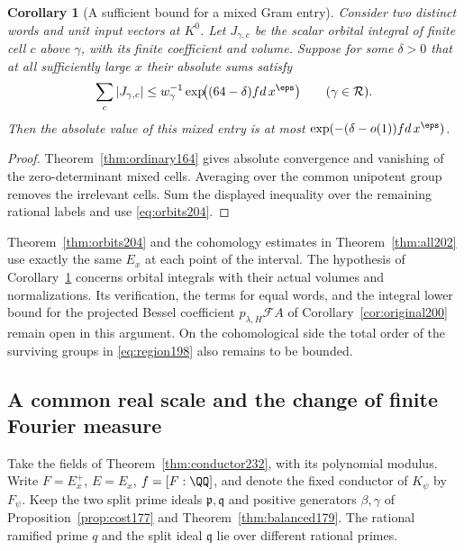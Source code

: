 \documentclass[a4paper,11pt]{article}
\newtheorem{corollary}[proposition]{Corollary}
\theoremstyle{definition}
\theoremstyle{remark}
\numberwithin{equation}{section}
\begin{document}
\begin{corollary}[A sufficient bound for a mixed Gram entry]
\label{cor:amplitude204}
Consider two distinct words and unit input vectors at \(K^0\).
Let \(J_{\gamma,c}\) be the scalar orbital integral of finite
cell \(c\) above \(\gamma\), with its finite coefficient and volume.
Suppose for some \(\delta>0\) that at all sufficiently large
\(x\) their absolute sums satisfy
\[
          \sum_c |J_{\gamma,c}|
            \le w_\gamma^{-1}\exp\!\bigl((64-\delta)fd\,x^\eps\bigr)
                    \qquad(\gamma\in\mathcal R).
\]
Then the absolute value of this mixed entry is at most
\(\exp(-(\delta-o(1))fd\,x^\eps)\).
\end{corollary}

\begin{proof}
Theorem~\ref{thm:ordinary164} gives absolute convergence and
vanishing of the zero-determinant mixed cells. Averaging over the
common unipotent group removes the irrelevant cells. Sum the
displayed inequality over the remaining rational labels and use
\eqref{eq:orbits204}.
\end{proof}

Theorem~\ref{thm:orbits204} and the cohomology estimates in
Theorem~\ref{thm:all202} use exactly the same \(E_x\) at each
point of the interval. The hypothesis of
Corollary~\ref{cor:amplitude204} concerns orbital integrals with
their actual volumes and normalizations. Its verification, the
terms for equal words, and the integral lower bound for the projected
Bessel coefficient \(p_{\lambda,H}\mathcal F A\) of
Corollary~\ref{cor:original200} remain open in this argument. On the
cohomological side the total order of the surviving groups in
\eqref{eq:region198} also remains to be bounded.

\subsection{A common real scale and the change of finite Fourier measure}\label{nav:VIII-30}
Take the fields of Theorem~\ref{thm:conductor232},
with its polynomial modulus. Write \(F=E_x^+\), \(E=E_x\),
\(f=[F:\QQ]\), and denote the fixed conductor of \(K_\psi\) by
\(F_\psi\). Keep the two split prime ideals \(\mathfrak p,\mathfrak q\)
and positive generators \(\beta,\gamma\) of
Proposition~\ref{prop:cost177} and Theorem~\ref{thm:balanced179}.
The rational ramified prime \(q\) and the split ideal \(\mathfrak q\)
lie over different rational primes.
\end{document}
